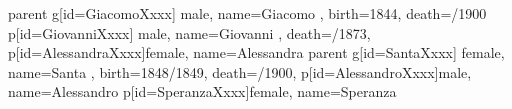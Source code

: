 \documentclass{article}
\begin{document}
\begin{midpage}
\begin{center}
\begin{genealogypicture}
{{{{{{                    }
                    parent{
                        g[id=GiacomoXxxx]{
                            male,
                            name={Giacomo },
                            birth={1844}{},
                            death={/1900}{}
                        }
                        p[id=GiovanniXxxx]{
                            male,
                            name={Giovanni },
                            death={/1873}{},
                        }
                        p[id=AlessandraXxxx]{female, name={Alessandra }}
                    }
                    parent{
                        g[id=SantaXxxx]{
                            female,
                            name={Santa },
                            birth={1848/1849}{},
                            death={/1900}{},
                        }
                        p[id=AlessandroXxxx]{male, name={Alessandro }}
                        p[id=SperanzaXxxx]{female, name={Speranza }}
                    }
                }
            }
        }
    }
}
\end{genealogypicture}

\end{center}
\end{midpage}
\end{document}
